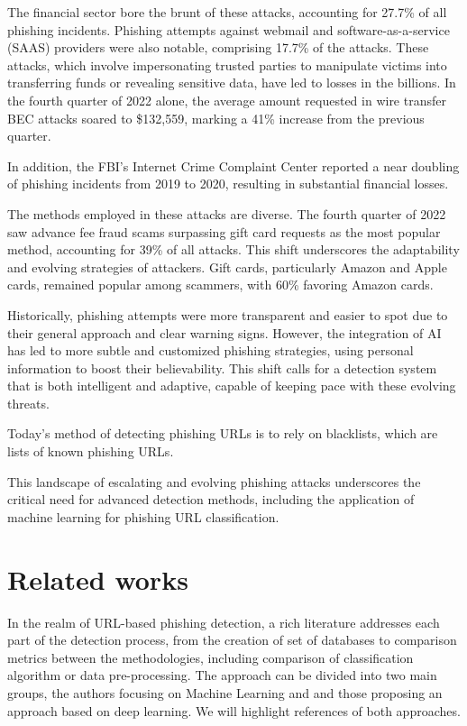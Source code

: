 \documentclass{article}
\begin{document}
    The financial sector bore the brunt of these attacks, accounting for 27.7\% of all phishing incidents.
    Phishing attempts against webmail and software-as-a-service (SAAS) providers were also notable, comprising 17.7\% of the attacks.
    These attacks, which involve impersonating trusted parties to manipulate victims into transferring funds or revealing sensitive data, have led to losses in the billions.
    In the fourth quarter of 2022 alone, the average amount requested in wire transfer BEC attacks soared to \$132,559, marking a 41\% increase from the previous quarter.

    In addition, the FBI’s Internet Crime Complaint Center reported a near doubling of phishing incidents from 2019 to 2020, resulting in substantial financial losses.

    The methods employed in these attacks are diverse.
    The fourth quarter of 2022 saw advance fee fraud scams surpassing gift card requests as the most popular method, accounting for 39\% of all attacks. This shift underscores the adaptability and evolving strategies of attackers. Gift cards, particularly Amazon and Apple cards, remained popular among scammers, with 60\% favoring Amazon cards.

    Historically, phishing attempts were more transparent and easier to spot due to their general approach and clear warning signs.
    However, the integration of AI has led to more subtle and customized phishing strategies, using personal information to boost their believability.
    This shift calls for a detection system that is both intelligent and adaptive, capable of keeping pace with these evolving threats.

    Today's method of detecting phishing URLs is to rely on blacklists, which are lists of known phishing URLs.

    This landscape of escalating and evolving phishing attacks underscores the critical need for advanced detection methods, including the application of machine learning for phishing URL classification.



    \section{Related works}\label{sec:related-works}

    In the realm of URL-based phishing detection, a rich literature addresses each part of the detection process, from the creation of set of databases to comparison metrics between the methodologies, including comparison of classification algorithm or data pre-processing.
    The approach can be divided into two main groups, the authors focusing on Machine Learning and and those proposing an approach based on deep learning.
    We will highlight references of both approaches.
\end{document}
